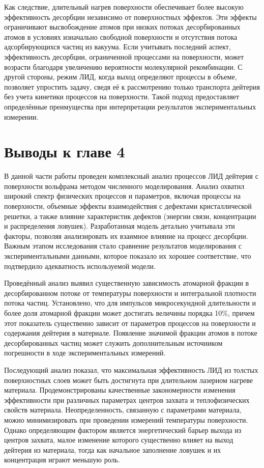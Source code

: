 Как следствие, длительный нагрев поверхности обеспечивает более высокую эффективность десорбции независимо от поверхностных эффектов. Эти эффекты ограничивают высвобождение атомов при низких потоках десорбированных атомов в условиях изначально свободной поверхности и отсутствия потока адсорбирующихся частиц из вакуума. Если учитывать последний аспект, эффективность десорбции, ограниченной процессами на поверхности, может возрасти благодаря увеличению вероятности молекулярной рекомбинации. С другой стороны, режим ЛИД, когда выход определяют процессы в объеме, позволяет упростить задачу, сведя её к рассмотрению только транспорта дейтерия без учета кинетики процессов на поверхности. Такой подход предоставляет определённые преимущества при интерпретации результатов экспериментальных измерении.

\section{Выводы к главе 4}

В данной части работы проведен комплексный анализ процессов ЛИД дейтерия с поверхности вольфрама методом численного моделирования. Анализ охватил широкий спектр физических процессов и параметров, включая процессы на поверхности, объемные эффекты взаимодействия с дефектами кристаллической решетки, а также влияние характеристик дефектов (энергии связи, концентрации и распределения ловушек). Разработанная модель детально учитывала эти факторы, позволяя анализировать их взаимное влияние на процесс десорбции. Важным этапом исследования стало сравнение результатов моделирования с экспериментальными данными, которое показало их хорошее соответствие, что подтвердило адекватность используемой модели.

Проведённый анализ выявил существенную зависимость атомарной фракции в десорбированном потоке от температуры поверхности и интегральной плотности потока частиц. Установлено, что для импульсов микросекундной длительности и более доля атомарной фракции может достигать величины порядка 10\%, причем этот показатель существенно зависит от параметров процессов на поверхности и содержания дейтерия в материале. Появление значимой фракции атомов в потоке десорбированных частиц может служить дополнительным источником погрешности в ходе экспериментальных измерений.

Последующий анализ показал, что максимальная эффективность ЛИД из толстых поверхностных слоев может быть достигнута при длительном лазерном нагреве материала. Продемонстрированы качественные закономерности изменения эффективности при различных параметрах центров захвата и теплофизических свойств материала. Неопределенность, связанную с параметрами материала, можно минимизировать при проведении измерений температуры поверхности. Однако определяющим фактором является энергетический барьер выхода из центров захвата, малое изменение которого существенно влияет на выход дейтерия из материала, тогда как начальное заполнение ловушек и их концентрация играют меньшую роль. 

